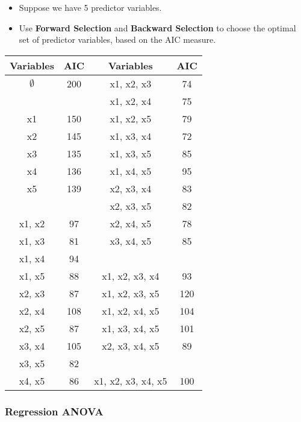 \documentclass[a4paper,12pt]{article}
\begin{document}
\begin{itemize}
	\item Suppose we have 5 predictor variables.
	\item Use \textbf{Forward Selection} and \textbf{Backward Selection} to choose the optimal set of predictor variables, based on the AIC measure.
\end{itemize}
{
	\large
	\begin{center}
		\begin{tabular}{||c|c||c|c||}
			\hline
			Variables & AIC & Variables & AIC \\ \hline \hline
			$\emptyset$	&	200	&	x1, x2, x3	&	74	\\ \hline
			\phantom{makemakespace}
			&	\phantom{makespace}
			&	x1, x2, x4	&	75	\\ \hline
			x1	&	150	&	x1, x2, x5	&	79	\\ \hline
			x2	&	145	&	x1, x3, x4	&	72	\\ \hline
			x3	&	135	&	x1, x3, x5	&	85	\\ \hline
			x4	&	136	&	x1, x4, x5	&	95	\\ \hline
			x5	&	139	&	x2, x3, x4	&	83	\\ \hline
			&		&	x2, x3, x5	&	82	\\ \hline
			x1, x2	&	97	&	x2, x4, x5	&	78	\\ \hline
			x1, x3	&	81	&	x3, x4, x5	&	85	\\ \hline
			x1, x4	&	94	&	\phantom{makemakespace}
			&	\phantom{makespace}
			\\ \hline
			x1, x5	&	88	&	x1, x2, x3, x4	&	93	\\ \hline
			x2, x3	&	87	&	x1, x2, x3, x5	&	120	\\ \hline
			x2, x4	&	108	&	x1, x2, x4, x5	&	104	\\ \hline
			x2, x5	&	87	&	x1, x3, x4, x5	&	101	\\ \hline
			x3, x4	&	105	&	x2, x3, x4, x5	&	89	\\ \hline
			x3, x5	&	82	&		&		\\ \hline
			x4, x5	&	86	&	x1, x2, x3, x4, x5	&	100	\\ \hline
		\end{tabular} 
	\end{center}
}
\newpage
\subsubsection*{Regression ANOVA}
\end{document}
